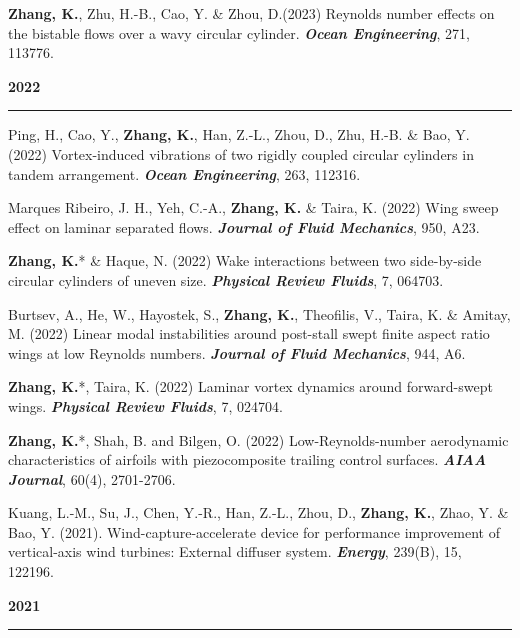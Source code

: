 \documentclass[10pt]{article}
\begin{document}
{\begin{etaremune}
 \item \textbf{Zhang, K.}, Zhu, H.-B., Cao, Y. \& Zhou, D.(2023) Reynolds number effects on the bistable flows over a wavy circular cylinder. \textit{\textbf{Ocean Engineering}}, 271, 113776.



 
 \item [] {\bf \color{Blue} 2022 \rule{14.8cm}{0.2mm}}
 
 \item Ping, H., Cao, Y., \textbf{Zhang, K.}, Han, Z.-L., Zhou, D., Zhu, H.-B. \& Bao, Y. (2022) Vortex-induced vibrations of two rigidly coupled circular cylinders in tandem arrangement. \textit{\textbf{Ocean Engineering}}, 263, 112316. 
 
 \item Marques Ribeiro, J. H., Yeh, C.-A., \textbf{Zhang, K.} \& Taira, K. (2022) Wing sweep effect on laminar separated flows.  \textit{\textbf{Journal of Fluid Mechanics}}, 950, A23. 

 \item \textbf{Zhang, K.}* \& Haque, N. (2022) Wake interactions between two side-by-side circular cylinders of uneven size.  \textit{\textbf{Physical Review Fluids}}, 7, 064703.

  \item Burtsev, A., He, W., Hayostek, S., \textbf{Zhang, K.}, Theofilis, V., Taira, K. \& Amitay, M. (2022) Linear modal instabilities around post-stall swept finite aspect ratio wings at low Reynolds numbers. \textit{\textbf{Journal of Fluid Mechanics}}, 944, A6.

  \item \textbf{Zhang, K.}*, Taira, K. (2022) Laminar vortex dynamics around forward-swept wings.  \textit{\textbf{Physical Review Fluids}}, 7, 024704.

  \item \textbf{Zhang, K.}*, Shah, B. and Bilgen, O. (2022) Low-Reynolds-number aerodynamic characteristics of airfoils with piezocomposite trailing control surfaces. \textit{\textbf{AIAA Journal}}, 60(4), 2701-2706.

	\item Kuang, L.-M., Su, J., Chen, Y.-R., Han, Z.-L., Zhou, D., \textbf{Zhang, K.}, Zhao, Y. \& Bao, Y. (2021). Wind-capture-accelerate device for performance improvement of vertical-axis wind turbines: External diffuser system. \textit{\textbf{Energy}}, 239(B), 15, 122196. 

\item [] {\bf \color{Blue} 2021 \rule{14.8cm}{0.2mm}}


\end{etaremune}}
\end{document}
